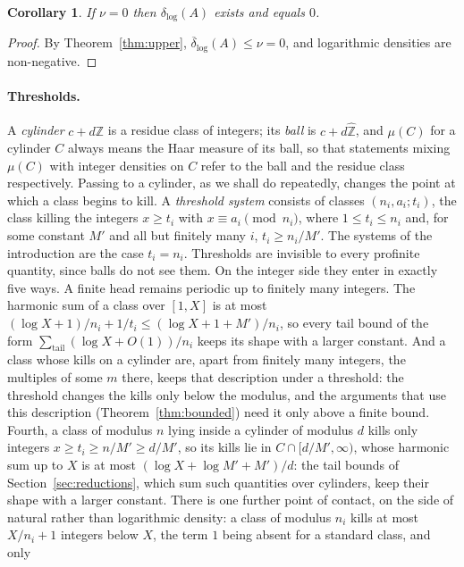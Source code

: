 \documentclass[11pt]{article}
\theoremstyle{plain}
\newtheorem{corollary}[theorem]{Corollary}
\theoremstyle{definition}
\newcommand{\Zhat}{\widehat{\mathbb{Z}}}
\newcommand{\dlog}{\delta_{\log}}
\begin{document}
\begin{corollary}\label{cor:nuzero}
If $\nu=0$ then $\dlog(A)$ exists and equals $0$.
\end{corollary}

\begin{proof}
By Theorem~\ref{thm:upper}, $\overline{\delta}_{\log}(A)\le\nu=0$,
and logarithmic densities are non-negative.
\end{proof}

\paragraph{Thresholds.}
A \emph{cylinder} $c+d\mathbb{Z}$ is a residue class of
integers; its \emph{ball} is $c+d\Zhat$, and $\mu(C)$ for a
cylinder $C$ always means the Haar measure of its ball, so that
statements mixing $\mu(C)$ with integer densities on $C$ refer to
the ball and the residue class respectively.  Passing to a
cylinder, as we shall do repeatedly, changes the
point at which a class begins to kill.  A \emph{threshold
system} consists of classes $(n_i,a_i;t_i)$, the class killing
the integers $x\ge t_i$ with $x\equiv a_i\pmod{n_i}$, where
$1\le t_i\le n_i$ and, for some constant $M'$ and all but
finitely many $i$, $t_i\ge n_i/M'$.  The systems of the
introduction are the case $t_i=n_i$.  Thresholds are invisible
to every profinite quantity, since balls do not see them.  On
the integer side they enter in exactly five ways.  A finite
head remains periodic up to finitely many integers.  The
harmonic sum of a class over $[1,X]$ is at most
$(\log X+1)/n_i+1/t_i\le(\log X+1+M')/n_i$, so every tail
bound of the form $\sum_{\text{tail}}(\log X+O(1))/n_i$ keeps
its shape with a larger constant.  And a class whose kills on a cylinder are, apart from
finitely many integers, the multiples of some $m$ there, keeps
that description under a threshold: the threshold changes the
kills only below the modulus, and the arguments that use this
description (Theorem~\ref{thm:bounded}) need it only above a
finite bound.  Fourth, a class of modulus $n$ lying inside a cylinder
of modulus $d$ kills only integers $x\ge t_i\ge n/M'\ge d/M'$,
so its kills lie in $C\cap[d/M',\infty)$, whose harmonic sum up
to $X$ is at most $(\log X+\log M'+M')/d$: the tail bounds of
Section~\ref{sec:reductions}, which sum such quantities over cylinders, keep their
shape with a larger constant.  There is one further point of
contact, on the side of natural rather than logarithmic density:
a class of modulus $n_i$ kills at most $X/n_i+1$ integers below
$X$, the term $1$ being absent for a standard class, and only
\end{document}
